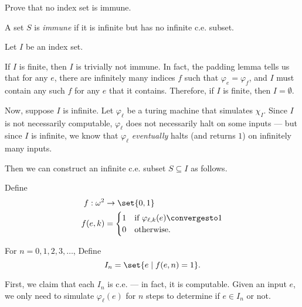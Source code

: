 \begin{problem}
  Prove that no index set is immune.


  \begin{answer}
    A set $S$ is \emph{immune} if it is infinite but has no
    infinite c.e. subset.

    Let $I$ be an index set.
    
    \begin{enumarabic}
      \item If $I$ is finite, then $I$ is trivially not immune.
        In fact, the padding lemma tells us that for any
        $e$, there are infinitely many indices $f$ such that
        $\varphi_e = \varphi_f$, and $I$ must contain
        any such $f$ for any $e$ that it contains.
        Therefore, if $I$ is finite, then $I = \emptyset$.
      \item Now, suppose $I$ is infinite.
        Let $\varphi_\ell$ be a turing machine that simulates
        $\chi_I$. Since $I$ is not necessarily computable,
        $\varphi_\ell$ does not necessarily halt on some inputs
        --- but since $I$ is infinite, we know that
        $\varphi_\ell$ \emph{eventually} halts (and returns $1$)
        on infinitely many inputs.

        Then we can construct an infinite c.e. subset $S \subseteq I$
        as follows.

        \step
        Define
            \begin{align*}
              f : \omega^2 &\to \set{0, 1} \\
              f(e, k) &= \begin{cases}
                1 & \text{if $\varphi_{\ell,k}(e) \convergesto 1$} \\
                0 & \text{otherwise.}
              \end{cases}  
            \end{align*}
        
        For $n = 0, 1, 2, 3, \ldots$,
        Define \[ I_n = \set{e \mid f(e, n) = 1}. \]

        \step
        First, we claim that each $I_n$ is c.e.
        --- in fact, it is computable.
        Given an input $e$, we only need to simulate
        $\varphi_{\ell}(e)$ for $n$ steps to determine
        if $e \in I_n$ or not.


\end{enumarabic}
\end{answer}
\end{problem}
